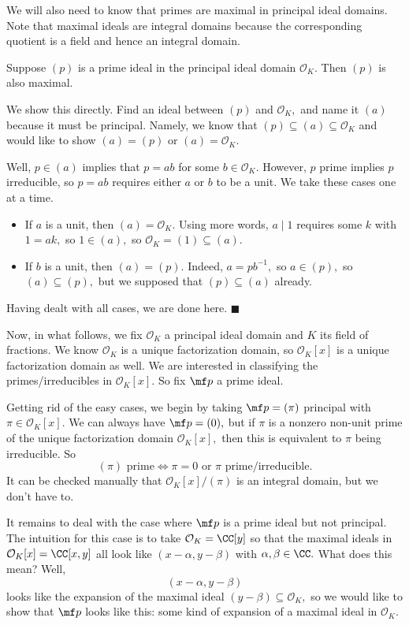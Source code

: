 We will also need to know that primes are maximal in principal ideal domains. Note that maximal ideals are integral domains because the corresponding quotient is a field and hence an integral domain.
\begin{lemma}
    Suppose $(p)$ is a prime ideal in the principal ideal domain $\mathcal O_K.$ Then $(p)$ is also maximal.
\end{lemma}
We show this directly. Find an ideal between $(p)$ and $\mathcal O_K,$ and name it $(a)$ because it must be principal. Namely, we know that $(p)\subseteq(a)\subseteq\mathcal O_K$ and would like to show $(a)=(p)$ or $(a)=\mathcal O_K.$

Well, $p\in(a)$ implies that $p=ab$ for some $b\in\mathcal O_K.$ However, $p$ prime implies $p$ irreducible, so $p=ab$ requires either $a$ or $b$ to be a unit. We take these cases one at a time.
\begin{itemize}
    \item If $a$ is a unit, then $(a)=\mathcal O_K.$ Using more words, $a\mid1$ requires some $k$ with $1=ak,$ so $1\in(a),$ so $\mathcal O_K=(1)\subseteq(a).$
    \item If $b$ is a unit, then $(a)=(p).$ Indeed, $a=pb^{-1},$ so $a\in(p),$ so $(a)\subseteq(p),$ but we supposed that $(p)\subseteq(a)$ already.
\end{itemize}
Having dealt with all cases, we are done here. $\blacksquare$

Now, in what follows, we fix $\mathcal O_K$ a principal ideal domain and $K$ its field of fractions. We know $\mathcal O_K$ is a unique factorization domain, so $\mathcal O_K[x]$ is a unique factorization domain as well. We are interested in classifying the primes/irreducibles in $\mathcal O_K[x].$ So fix $\mf p$ a prime ideal.

Getting rid of the easy cases, we begin by taking $\mf p=(\pi)$ principal with $\pi\in\mathcal O_K[x].$ We can always have $\mf p=(0),$ but if $\pi$ is a nonzero non-unit prime of the unique factorization domain $\mathcal O_K[x],$ then this is equivalent to $\pi$ being irreducible. So
\[(\pi)\text{ prime}\iff\pi=0\text{ or }\pi\text{ prime/irreducible}.\]
It can be checked manually that $\mathcal O_K[x]/(\pi)$ is an integral domain, but we don't have to.

It remains to deal with the case where $\mf p$ is a prime ideal but not principal. The intuition for this case is to take $\mathcal O_K=\CC[y]$ so that the maximal ideals in $\mathcal O_K[x]=\CC[x,y]$ all look like $(x-\alpha,y-\beta)$ with $\alpha,\beta\in\CC.$ What does this mean? Well,
\[(x-\alpha,y-\beta)\]
looks like the expansion of the maximal ideal $(y-\beta)\subseteq\mathcal O_K,$ so we would like to show that $\mf p$ looks like this: some kind of expansion of a maximal ideal in $\mathcal O_K.$

